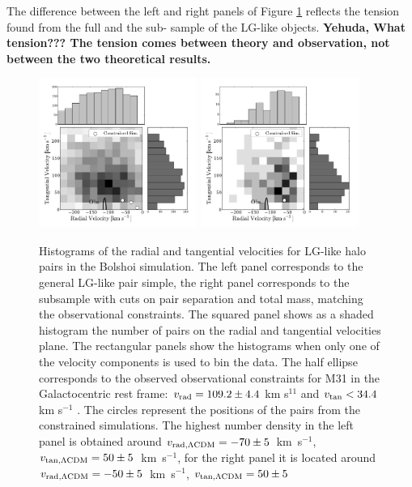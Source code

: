 \documentclass{emulateapj}
\newcommand{\kms}{\,km~s$^{-1}$}
\begin{document}
The difference between the left and right panels of Figure
\ref{fig:rt} reflects  the tension found from the full and the sub-
sample of the LG-like objects. {\bf Yehuda, What tension??? The
  tension comes between theory and observation, not between the two
  theoretical results.} 




\begin{figure}
\begin{center}
\includegraphics[keepaspectratio=true,width=0.46\textwidth]{./figures/test_rt_BDM.pdf}
\includegraphics[keepaspectratio=true,width=0.46\textwidth]{./figures/test_rt_BDM_narrow.pdf}
\caption{Histograms of the radial and tangential velocities for
  LG-like halo pairs in the Bolshoi simulation. The left panel
  corresponds to the general LG-like pair simple, the right panel
  corresponds to the subsample with cuts on pair separation and total
  mass, matching the observational constraints. The squared panel
  shows as a shaded histogram the number of pairs on the radial and
  tangential velocities plane. The rectangular panels show the
  histograms when only one of the velocity components is used to bin
  the data. The half ellipse corresponds to the observed observational
  constraints for M31 in the Galactocentric rest frame: $v_{\rm
    rad}=109.2\pm 4.4$ km s$^{11}$ and $v_{\rm tan}< 34.4$ km s$^{-1}$
  \citep{vanderMarel12}. The circles represent the positions of the
  pairs from the constrained simulations. The highest number density
  in the left panel is obtained around $v_{\rm rad,\Lambda CDM} =
  -70\pm5$ \kms, $v_{\rm tan,\Lambda CDM} = 50\pm5$ \kms, for the
  right panel it is located around $v_{\rm rad,\Lambda CDM} = -50\pm5$
  \kms, $v_{\rm tan,\Lambda CDM} = 50\pm5$ } 
\label{fig:rt}
\end{center}

\end{figure}
\end{document}
